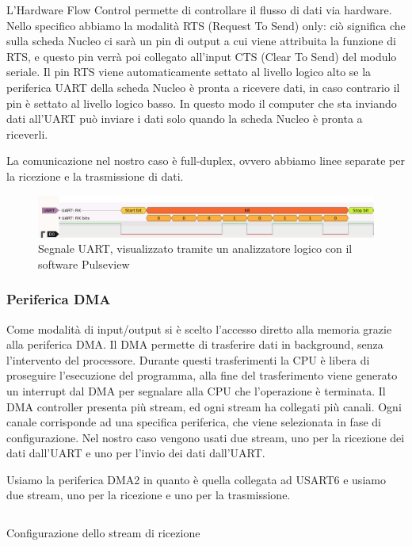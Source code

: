 L'Hardware Flow Control permette di controllare il flusso di dati via hardware. Nello specifico abbiamo la modalità RTS (Request To Send) only: ciò significa che sulla scheda Nucleo ci sarà un pin di output a cui viene attribuita la funzione di RTS, e questo pin verrà poi collegato all'input CTS (Clear To Send) del modulo seriale. Il pin RTS viene automaticamente settato al livello logico alto se la periferica UART della scheda Nucleo è pronta a ricevere dati, in caso contrario il pin è settato al livello logico basso. In questo modo il computer che sta inviando dati all'UART può inviare i dati solo quando la scheda Nucleo è pronta a riceverli.

La comunicazione nel nostro caso è full-duplex, ovvero abbiamo linee separate per la ricezione e la trasmissione di dati.

\begin{figure}[htb]
    \centering
    \includegraphics[width=\textwidth]{images/uart_protocol.png}
    \caption{Segnale UART, visualizzato tramite un analizzatore logico con il software Pulseview}
    \label{fig:uart_protocol}
\end{figure}

\subsubsection{Periferica DMA}
Come modalità di input/output si è scelto l'accesso diretto alla memoria grazie alla periferica DMA.
Il DMA permette di trasferire dati in background, senza l'intervento del processore. Durante questi trasferimenti la CPU è libera di proseguire l'esecuzione del programma, alla fine del trasferimento viene generato un interrupt dal DMA per segnalare alla CPU che l'operazione è terminata.
Il DMA controller presenta più stream, ed ogni stream ha collegati più canali. Ogni canale corrisponde ad una specifica periferica, che viene selezionata in fase di configurazione.
Nel nostro caso vengono usati due stream, uno per la ricezione dei dati dall'UART e uno per l'invio dei dati dall'UART.

Usiamo la periferica DMA2 in quanto è quella collegata ad USART6 e usiamo due stream, uno per la ricezione e uno per la trasmissione.

\begin{listing}[ht]
\inputminted[frame=single,framesep=10pt]{c}{codice/dma2_rx_config.c}
\caption{Configurazione dello stream di ricezione}
\label{listing:DMA_rx_config}
\end{listing}

